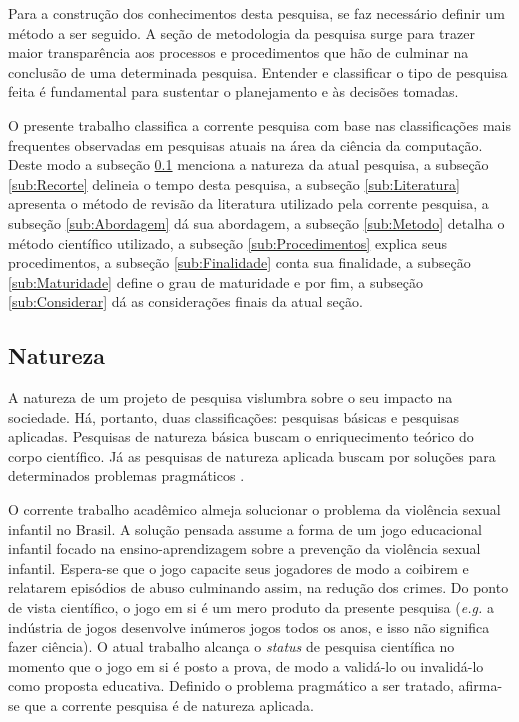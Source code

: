 Para a construção dos conhecimentos desta pesquisa, se faz necessário definir um método a ser seguido. A seção de metodologia da pesquisa surge para trazer maior transparência aos processos e procedimentos que hão de culminar na conclusão de uma determinada pesquisa. Entender e classificar o tipo de pesquisa feita é fundamental para sustentar o planejamento e às decisões tomadas.

O presente trabalho classifica a corrente pesquisa com base nas classificações mais frequentes observadas em pesquisas atuais na área da ciência da computação. Deste modo a subseção \ref{sub:Natureza} menciona a natureza da atual pesquisa, a subseção \ref{sub:Recorte} delineia o tempo desta pesquisa, a subseção \ref{sub:Literatura} apresenta o método de revisão da literatura utilizado pela corrente pesquisa, a subseção \ref{sub:Abordagem} dá sua abordagem, a subseção \ref{sub:Metodo} detalha o método científico utilizado, a subseção \ref{sub:Procedimentos} explica seus procedimentos, a subseção \ref{sub:Finalidade} conta sua finalidade, a subseção \ref{sub:Maturidade} define o grau de maturidade e por fim, a subseção \ref{sub:Considerar} dá as considerações finais da atual seção. 


\subsection{Natureza}\label{sub:Natureza}

A natureza de um projeto de pesquisa vislumbra sobre o seu impacto na sociedade. Há, portanto, duas classificações: pesquisas básicas e pesquisas aplicadas. Pesquisas de natureza básica buscam o enriquecimento teórico do corpo científico. Já as pesquisas de natureza aplicada buscam por soluções para determinados problemas pragmáticos \cite{zanella2006metodologia}.

O corrente trabalho acadêmico almeja solucionar o problema da violência sexual infantil no Brasil. A solução pensada assume a forma de um jogo educacional infantil focado na ensino-aprendizagem sobre a prevenção da violência sexual infantil. Espera-se que o jogo capacite seus jogadores de modo a coibirem e relatarem episódios de abuso culminando assim, na redução dos crimes. Do ponto de vista científico, o jogo em si é um mero produto da presente pesquisa (\textit{e.g.} a indústria de jogos desenvolve inúmeros jogos todos os anos, e isso não significa fazer ciência). O atual trabalho alcança o \textit{status} de pesquisa científica no momento que o jogo em si é posto a prova, de modo a validá-lo ou invalidá-lo como proposta educativa. Definido o problema pragmático a ser tratado, afirma-se que a corrente pesquisa é de natureza aplicada.


